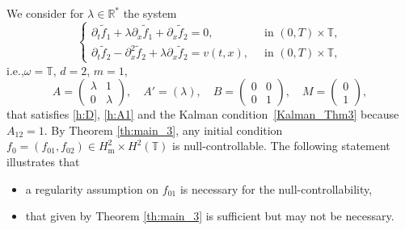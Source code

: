 \documentclass[11pt]{article}
\newcommand{\ie}{i.e.,\xspace}
\theoremstyle{plain}
\theoremstyle{definition}
\theoremstyle{remark}
\newcommand{\set}{\mathbb}
\newcommand{\T}{\set{T}}
\newcommand{\m}{{\mathrm m}}
\begin{document}
We consider for $\lambda\in\mathbb{R}^*$ the system\vspace*{-3pt}
\begin{equation} \label{c-ex_parab}
\begin{cases}
\partial_t \widetilde{f}_1 + \lambda \partial_x \widetilde{f}_1 + \partial_x \widetilde{f}_2 = 0, &\ \text{ in } (0,T)\times\T, \\
\partial_t \widetilde{f}_2 - \partial_x^2 \widetilde{f}_2 + \lambda \partial_x \widetilde{f}_2 = v(t,x), &\ \text{ in } (0,T)\times\T,
\end{cases}
\end{equation}
\ie $\omega=\T$, $d=2$, $m=1$,\vspace*{-3pt}\enlargethispage{.5\baselineskip}%
\[
A=\begin{pmatrix}
\lambda & 1 \\ 0 & \lambda
\end{pmatrix},\quad
A'=(\lambda), \quad
B=\begin{pmatrix}
0 & 0 \\ 0 & 1
\end{pmatrix},\quad
M=\begin{pmatrix}
0 \\ 1
\end{pmatrix},
\]
that satisfies \eqref{h:D}, \eqref{h:A1} and the Kalman condition~\eqref{Kalman_Thm3} because $A_{12}=1$.
By Theorem \ref{th:main_3}, any initial condition $f_0=(f_{01},f_{02})\in H^{2}_\m \times H^2(\T)$ is null-controllable.
The following statement illustrates that
\begin{itemize}
\item a regularity assumption on $f_{01}$ is necessary for the null-controllability,
\item that given by Theorem \ref{th:main_3} is sufficient but may not be necessary.
\end{itemize}
\end{document}
